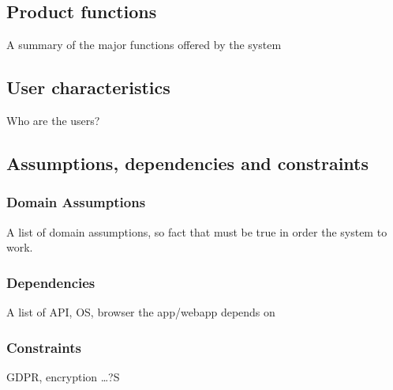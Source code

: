 \subsection{Product functions}
A summary of the major functions offered by the system

\subsection{User characteristics}
Who are the users?

\subsection{Assumptions, dependencies and constraints}
\subsubsection*{Domain Assumptions}
A list of domain assumptions, so fact that must be true in order the system to work.
\subsubsection*{Dependencies}
A list of API, OS, browser the app/webapp depends on
\subsubsection*{Constraints}
GDPR, encryption \dots?S
